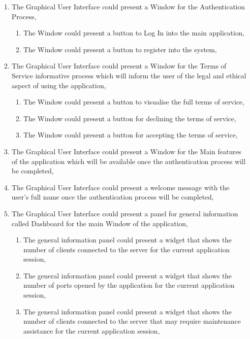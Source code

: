 \begin{enumerate}
    \item The Graphical User Interface could present a Window for the Authentication Process,
    \begin{enumerate}
        \item The Window could present a button to Log In into the main application,
        \item The Window could present a button to register into the system,
    \end{enumerate}
    \item The Graphical User Interface could present a Window for the Terms of Service informative process which
    will inform the user of the legal and ethical aspect of using the application,
    \begin{enumerate}
        \item The Window could present a button to visualise the full terms of service,
        \item The Window could present a button for declining the terms of service,
        \item The Window could present a button for accepting the terms of service,
    \end{enumerate}
    \item The Graphical User Interface could present a Window for the Main features of the application which
    will be available once the authentication process will be completed,
    \item The Graphical User Interface could present a welcome message with the user's full name once the
    authentication process will be completed,
    \item The Graphical User Interface could present a panel for general information called Dashboard for the main
    Window of the application,
    \begin{enumerate}
        \item The general information panel could present a widget that shows the number of clients
        connected to the server for the current application session,
        \item The general information panel could present a widget that shows the number of ports opened
        by the application for the current application session,
        \item The general information panel could present a widget that shows the number of clients connected
        to the server that may require maintenance assistance for the current application session,

\end{enumerate}
\end{enumerate}
